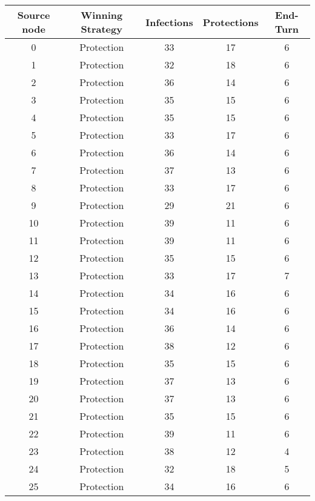 \documentclass[results.tex]{subfiles}
\begin{document}
\begin{center}
  \begin{tabular}{| c || c | c | c | c |}
    \hline
    {\bfseries Source node} & {\bfseries Winning Strategy} & {\bfseries Infections} & {\bfseries Protections} & {\bfseries End-Turn} \\  %
    \hline\hline
    0 & Protection & 33 & 17 & 6 \\ 
    \hline
    1 & Protection & 32 & 18 & 6 \\ 
    \hline
    2 & Protection & 36 & 14 & 6 \\ 
    \hline
    3 & Protection & 35 & 15 & 6 \\ 
    \hline
    4 & Protection & 35 & 15 & 6 \\ 
    \hline
    5 & Protection & 33 & 17 & 6 \\ 
    \hline
    6 & Protection & 36 & 14 & 6 \\ 
    \hline
    7 & Protection & 37 & 13 & 6 \\ 
    \hline
    8 & Protection & 33 & 17 & 6 \\ 
    \hline
    9 & Protection & 29 & 21 & 6 \\ 
    \hline
    10 & Protection & 39 & 11 & 6 \\ 
    \hline
    11 & Protection & 39 & 11 & 6 \\ 
    \hline
    12 & Protection & 35 & 15 & 6 \\ 
    \hline
    13 & Protection & 33 & 17 & 7 \\ 
    \hline
    14 & Protection & 34 & 16 & 6 \\ 
    \hline
    15 & Protection & 34 & 16 & 6 \\ 
    \hline
    16 & Protection & 36 & 14 & 6 \\ 
    \hline
    17 & Protection & 38 & 12 & 6 \\ 
    \hline
    18 & Protection & 35 & 15 & 6 \\ 
    \hline
    19 & Protection & 37 & 13 & 6 \\ 
    \hline
    20 & Protection & 37 & 13 & 6 \\ 
    \hline
    21 & Protection & 35 & 15 & 6 \\ 
    \hline
    22 & Protection & 39 & 11 & 6 \\ 
    \hline
    23 & Protection & 38 & 12 & 4 \\ 
    \hline
    24 & Protection & 32 & 18 & 5 \\ 
    \hline
    25 & Protection & 34 & 16 & 6 \\ 

\end{tabular}
\end{center}
\end{document}
